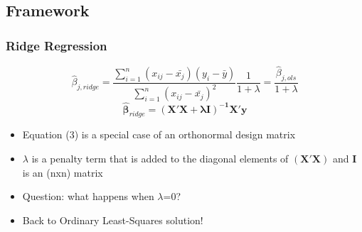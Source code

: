 \documentclass[]{beamer}
\begin{document}
                                                   \subsection{Framework}
                                                   \begin{frame}
                                                   \frametitle{Ridge Regression}   %
                                                   \begin{equation}
                                                   \hat{\beta}_{j,ridge} = \frac{\sum_{i=1}^{n} (x_{ij} - \bar{x_j})(y_i - \bar{y})} {\sum_{i=1}^{n} (x_{ij} - \bar{x_j})^2} \frac{1}{1+\lambda} = \frac{\hat{\beta}_{j,ols}} {1 + \lambda}
                                                   \end{equation}
                                                   \begin{equation}
                                                   \boldsymbol{\hat{\beta}}_{ridge} = \boldsymbol{ (X'X+\lambda I)^{-1} X'y}
                                                  \end{equation}
                                                  \begin{itemize}
                                                  \item<1-> Equation (3) is a special case of an orthonormal design matrix 
                                                  \item<2-> $\lambda$ is a penalty term that is added to the diagonal elements of $\boldsymbol{(X'X)}$ and $\boldsymbol{I}$ is an (nxn) matrix
\item<3-> Question: what happens when $\lambda$=0?
\item<4-> Back to Ordinary Least-Squares solution!
  \end{itemize}
\end{frame}

\end{document}
